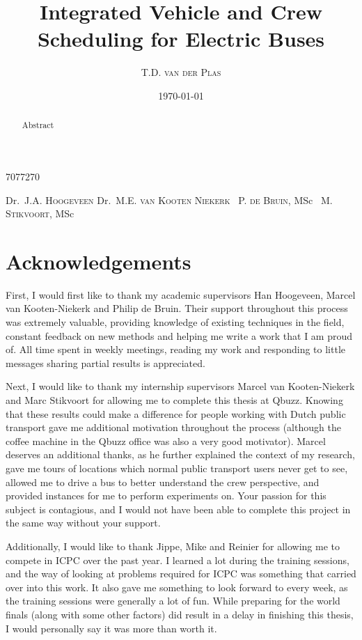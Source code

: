 \documentclass[]{article}
\begin{document}
\title{Integrated Vehicle and Crew Scheduling for Electric Buses}
\author
    {T.D. \textsc{van der Plas}} %
    {7077270}           %
\date{\today}

\supervisors
    {Dr.~J.A. \textsc{Hoogeveen}} %
    {Dr.~M.E. \textsc{van Kooten Niekerk}} %
    {~P. \textsc{de Bruin}, MSc} %
    {~M. \textsc{Stikvoort}, MSc} %



\begin{abstract}
Abstract
\end{abstract}
\newpage

\section*{Acknowledgements}
First, I would first like to thank my academic supervisors Han Hoogeveen, Marcel van Kooten-Niekerk and Philip de Bruin. Their support throughout this process was extremely valuable, providing knowledge of existing techniques in the field, constant feedback on new methods and helping me write a work that I am proud of. All time spent in weekly meetings, reading my work and responding to little messages sharing partial results is appreciated. 

Next, I would like to thank my internship supervisors Marcel van Kooten-Niekerk and Marc Stikvoort for allowing me to complete this thesis at Qbuzz. Knowing that these results could make a difference for people working with Dutch public transport gave me additional motivation throughout the process (although the coffee machine in the Qbuzz office was also a very good motivator). Marcel deserves an additional thanks, as he further explained the context of my research, gave me tours of locations which normal public transport users never get to see, allowed me to drive a bus to better understand the crew perspective, and provided instances for me to perform experiments on. Your passion for this subject is contagious, and I would not have been able to complete this project in the same way without your support. 

Additionally, I would like to thank Jippe, Mike and Reinier for allowing me to compete in ICPC over the past year. I learned a lot during the training sessions, and the way of looking at problems required for ICPC was something that carried over into this work. It also gave me something to look forward to every week, as the training sessions were generally a lot of fun. While preparing for the world finals (along with some other factors) did result in a delay in finishing this thesis, I would personally say it was more than worth it. 
\end{document}
